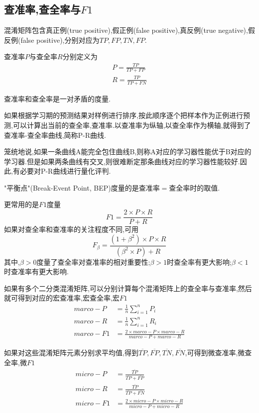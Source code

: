 \subsection{查准率,查全率与$F1$}

混淆矩阵包含真正例(true positive),假正例(false positive),真反例(true negative),假反例(false positive),分别对应为$TP,FP,TN,FP$.

查准率$P$与查全率$R$分别定义为
\begin{equation}\begin{split}
P=\frac{TP}{TP+FP}\\
R=\frac{TP}{TP+FN}
\end{split}\end{equation}

查准率和查全率是一对矛盾的度量.

如果根据学习期的预测结果对样例进行排序,按此顺序逐个把样本作为正例进行预测,可以计算出当前的查全率,查准率.以查准率为纵轴,以查全率作为横轴,就得到了查准率-查全率曲线,简称P-R曲线.

笼统地说,如果一条曲线A能完全包住曲线B,则称A对应的学习器性能优于B对应的学习器.但是如果两条曲线有交叉,则很难断定那条曲线对应的学习器性能较好.因此,有必要对P-R曲线进行量化评判.

"平衡点"(Break-Event Point, BEP)度量的是查准率$=$查全率时的取值.

更常用的是$F1$度量
\begin{equation}
F1=\frac{2\times P\times R}{P+R}
\end{equation}
如果对查全率和查准率的关注程度不同,可用
\begin{equation}
F_\beta=\frac{(1+\beta^2)\times P\times R}{(\beta^2\times P)+R}
\end{equation}
其中,$\beta>0$度量了查全率对查准率的相对重要性;$\beta>1$时查全率有更大影响;$\beta<1$时查准率有更大影响.

如果有多个二分类混淆矩阵,可以分别计算每个混淆矩阵上的查全率与查准率,然后就可得到对应的宏查准率,宏查全率,宏$F1$
\begin{equation}\begin{split}
marco-P&=\frac{1}{n}\sum_{i=1}^nP_i\\
marco-R&=\frac{1}{n}\sum_{i=1}^nR_i\\
marco-F1&=\frac{2\times marco-P \times marco-R}{marco-P+marco-R}
\end{split}\end{equation}

如果对这些混淆矩阵元素分别求平均值,得到$\overline{TP},\overline{FP},\overline{TN},\overline{FN}$,可得到微查准率,微查全率,微$F1$
\begin{equation}\begin{split}
micro-P&=\frac{\overline{TP}}{\overline{TP}+\overline{FP}}\\
micro-R&=\frac{\overline{TP}}{\overline{TP}+\overline{FN}}\\
micro-F1&=\frac{2\times micro-P \times micro-R}{micro-P+micro-R}
\end{split}\end{equation}

